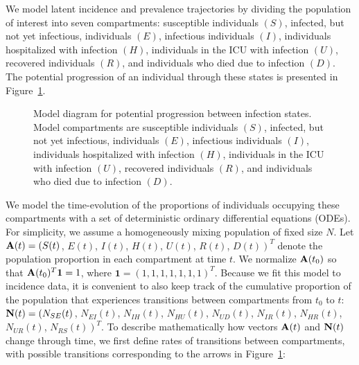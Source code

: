 We model latent incidence and prevalence trajectories by dividing the population of interest into seven compartments: susceptible individuals \( (S) \), infected, but not yet infectious, individuals \( (E) \), infectious individuals \( (I) \), individuals hospitalized with infection \( (H) \), individuals in the ICU with infection \( (U) \),  recovered individuals \( (R) \), and individuals who died due to infection \( (D) \).
The potential progression of an individual through these states is presented in Figure~\ref{ch_5:fig:model_diagram}.
\begin{figure}
    \centering
    \caption[State transition diagram.]{Model diagram for potential progression between infection states.
    Model compartments are susceptible individuals \( (S) \), infected, but not yet infectious, individuals \( (E) \), infectious individuals \( (I) \), individuals hospitalized with infection \( (H) \), individuals in the ICU with infection \( (U) \),  recovered individuals \( (R) \), and individuals who died due to infection \( (D) \).}
    \label{ch_5:fig:model_diagram}
\end{figure}
We model the time-evolution of the proportions of individuals occupying these compartments with a set of deterministic ordinary differential equations (ODEs).
For simplicity, we assume a homogeneously mixing population of fixed size \( N \).
Let \( \mathbf{A}(t) = \left(S(t) \right.\), \( E(t) \), \( I(t) \), \( H(t) \), \( U(t) \), \( R(t) \), \( \left. D(t) \right)^T \) denote the population proportion in each compartment at time \( t \).
We normalize \( \mathbf{A}(t_0) \) so that \( \mathbf{A}(t_0)^T\boldsymbol{1} = 1\), where \( \boldsymbol{1} = (1, 1, 1, 1, 1, 1, 1)^T \).
Because we fit this model to incidence data, it is convenient to also keep track of the cumulative proportion of the population that experiences transitions between compartments from \( t_0 \) to \( t \): \( \mathbf{N}(t) = \left(N_{SE}(t) \right. \), \( N_{EI}(t) \), \( N_{IH}(t) \), \( N_{HU}(t) \), \( N_{UD}(t) \), \( N_{IR}(t) \), \( N_{HR}(t) \), \( N_{UR}(t) \), \( \left. N_{RS}(t) \right)^T\).
To describe mathematically how vectors $\mathbf{A}(t)$ and $\mathbf{N}(t)$ change through time, we first define rates of transitions between compartments, with possible transitions corresponding to the arrows in Figure~\ref{ch_5:fig:model_diagram}:

